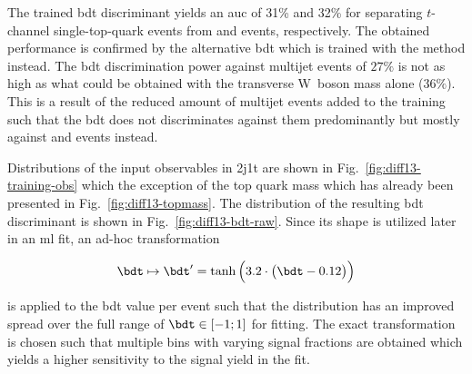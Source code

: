 The trained \gls{bdt} discriminant yields an \gls{auc} of 31\% and 32\% for separating $t$-channel single-top-quark events from \ttbar and \wjets events, respectively. The obtained performance is confirmed by the alternative \gls{bdt} which is trained with the \GRADIENTBOOST method instead. The \gls{bdt} discrimination power against multijet events of $27\%$ is not as high as what could be obtained with the transverse W~boson mass alone ($36\%$). This is a result of the reduced amount of multijet events added to the training such that the \gls{bdt} does not discriminates against them predominantly but mostly against \ttbar and \wjets events instead.

Distributions of the input observables in 2j1t are shown in Fig.~\ref{fig:diff13-training-obs} which the exception of the top quark mass which has already been presented in Fig.~\ref{fig:diff13-topmass}. The distribution of the resulting \gls{bdt} discriminant is shown in Fig.~\ref{fig:diff13-bdt-raw}. Since its shape is utilized later in an \gls{ml} fit, an ad-hoc transformation 

\begin{equation}
\bdt\mapsto\bdt^\prime=\tanh\Big(3.2\cdot\big(\bdt-0.12\big)\Big)
\end{equation}

is applied to the \gls{bdt} value per event such that the distribution has an improved spread over the full range of $\bdt\in[-1;1]$ for fitting. The exact transformation is chosen such that multiple bins with varying signal fractions are obtained which yields a higher sensitivity to the signal yield in the fit.

